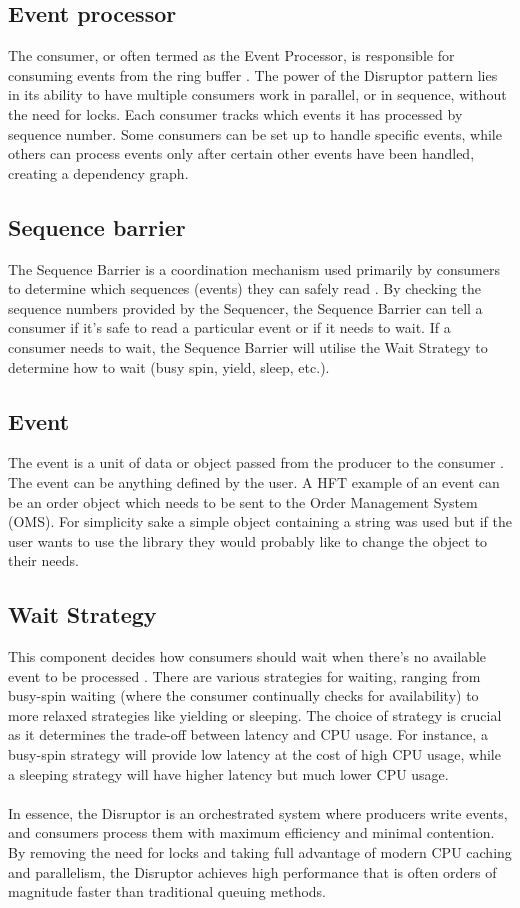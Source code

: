 \documentclass{article}
\theoremstyle{break}
\begin{document}
\subsection*{Event processor}
The consumer, or often termed as the Event Processor, is responsible for consuming events from the ring buffer \cite{13}. The power of the Disruptor pattern lies in its ability to have multiple consumers work in parallel, or in sequence, without the need for locks. Each consumer tracks which events it has processed by sequence number. Some consumers can be set up to handle specific events, while others can process events only after certain other events have been handled, creating a dependency graph.

\subsection*{Sequence barrier}
The Sequence Barrier is a coordination mechanism used primarily by consumers to determine which sequences (events) they can safely read \cite{13}. By checking the sequence numbers provided by the Sequencer, the Sequence Barrier can tell a consumer if it's safe to read a particular event or if it needs to wait. If a consumer needs to wait, the Sequence Barrier will utilise the Wait Strategy to determine how to wait (busy spin, yield, sleep, etc.).


\subsection*{Event}
The event is a unit of data or object passed from the producer to the consumer \cite{13}. The event can be anything defined by the user. A HFT example of an event can be an order object which needs to be sent to the Order Management System (OMS). For simplicity sake a simple object containing a string was used but if the user wants to use the library they would probably like to change the object to their needs.

\subsection*{Wait Strategy}
This component decides how consumers should wait when there's no available event to be processed \cite{13}. There are various strategies for waiting, ranging from busy-spin waiting (where the consumer continually checks for availability) to more relaxed strategies like yielding or sleeping. The choice of strategy is crucial as it determines the trade-off between latency and CPU usage. For instance, a busy-spin strategy will provide low latency at the cost of high CPU usage, while a sleeping strategy will have higher latency but much lower CPU usage. \\
\\
In essence, the Disruptor is an orchestrated system where producers write events, and consumers process them with maximum efficiency and minimal contention. By removing the need for locks and taking full advantage of modern CPU caching and parallelism, the Disruptor achieves high performance that is often orders of magnitude faster than traditional queuing methods.
\end{document}
